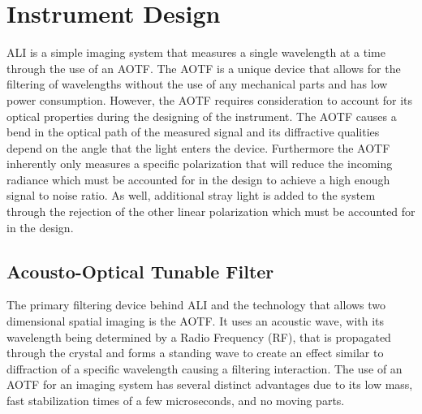 \documentclass[12pt]{article}
\begin{document}

\section{Instrument Design}

ALI is a simple imaging system that measures a single wavelength at a time through the use of an AOTF. The AOTF is a unique device that allows for the filtering of wavelengths without the use of any mechanical parts and has low power consumption. However, the AOTF requires consideration to account for its optical properties during the designing of the instrument. The AOTF causes a bend in the optical path of the measured signal and its diffractive qualities depend on the angle that the light enters the device. Furthermore the AOTF inherently only measures a specific polarization that will reduce the incoming radiance which must be accounted for in the design to achieve a high enough signal to noise ratio. As well, additional stray light is added to the system through the rejection of the other linear polarization which must be accounted for in the design.

\subsection{Acousto-Optical Tunable Filter}

The primary filtering device behind ALI and the technology that allows two dimensional spatial imaging is the AOTF. It uses an acoustic wave, with its wavelength being determined by a Radio Frequency (RF), that is propagated through the crystal and forms a standing wave to create an effect similar to diffraction of a specific wavelength causing a filtering interaction. The use of an AOTF for an imaging system has several distinct advantages due to its low mass, fast stabilization times of a few microseconds, and no moving parts.
\end{document}
